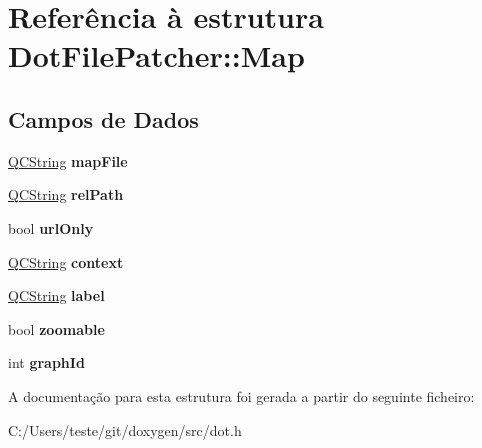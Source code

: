 \hypertarget{struct_dot_file_patcher_1_1_map}{\section{Referência à estrutura Dot\-File\-Patcher\-:\-:Map}
\label{struct_dot_file_patcher_1_1_map}
}
\subsection*{Campos de Dados}
\begin{DoxyCompactItemize}
\item 
\hypertarget{struct_dot_file_patcher_1_1_map_ade343aa3f9d3076a979be0f143501b0d}{\hyperlink{class_q_c_string}{Q\-C\-String} {\bfseries map\-File}}\label{struct_dot_file_patcher_1_1_map_ade343aa3f9d3076a979be0f143501b0d}

\item 
\hypertarget{struct_dot_file_patcher_1_1_map_afcef5f77de13d4a0ec733abee00e8484}{\hyperlink{class_q_c_string}{Q\-C\-String} {\bfseries rel\-Path}}\label{struct_dot_file_patcher_1_1_map_afcef5f77de13d4a0ec733abee00e8484}

\item 
\hypertarget{struct_dot_file_patcher_1_1_map_a4e928c043fa4cda9598f10f41e5ab641}{bool {\bfseries url\-Only}}\label{struct_dot_file_patcher_1_1_map_a4e928c043fa4cda9598f10f41e5ab641}

\item 
\hypertarget{struct_dot_file_patcher_1_1_map_a62c191b491f85b6b360c82e5dccfcc78}{\hyperlink{class_q_c_string}{Q\-C\-String} {\bfseries context}}\label{struct_dot_file_patcher_1_1_map_a62c191b491f85b6b360c82e5dccfcc78}

\item 
\hypertarget{struct_dot_file_patcher_1_1_map_ad961cc9bd17b7533dc02fe0826647dc7}{\hyperlink{class_q_c_string}{Q\-C\-String} {\bfseries label}}\label{struct_dot_file_patcher_1_1_map_ad961cc9bd17b7533dc02fe0826647dc7}

\item 
\hypertarget{struct_dot_file_patcher_1_1_map_ab1995f4bc72bcb5dd384a92ca0f25390}{bool {\bfseries zoomable}}\label{struct_dot_file_patcher_1_1_map_ab1995f4bc72bcb5dd384a92ca0f25390}

\item 
\hypertarget{struct_dot_file_patcher_1_1_map_a8529c3ca809cd20535b40eed427cfc2a}{int {\bfseries graph\-Id}}\label{struct_dot_file_patcher_1_1_map_a8529c3ca809cd20535b40eed427cfc2a}

\end{DoxyCompactItemize}


A documentação para esta estrutura foi gerada a partir do seguinte ficheiro\-:\begin{DoxyCompactItemize}
\item 
C\-:/\-Users/teste/git/doxygen/src/dot.\-h\end{DoxyCompactItemize}
